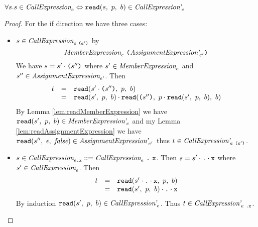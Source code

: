 \documentclass[preprint,10pt]{sigplanconf}
\begin{document}
\begin{lemma}\mbox{}
  
  \( \forall s. s \in \textit{CallExpression}_{e} \Leftrightarrow 
  \texttt{read}(s,~p,~b) \in \textit{CallExpression'}_{e} \)
\end{lemma}
\begin{proof}
  For the if direction we have three cases:
  \begin{itemize}
  \item \( s \in \textit{CallExpression}_{e~\texttt{(}e'\texttt{)}} \) by
    \[
    \textit{MemberExpression}_{e}~\texttt{(}\textit{AssignmentExpression'}_{e'}\texttt{)}
    \]
    We have \( s = s' \cdot \texttt{(}s''\texttt{)} \) where \( s' \in
    \textit{MemberExpression}_{e} \) and \( s'' \in
    \textit{AssignmentExpression}_{e'} \). Then
    \[
    \begin{array}{rcl}
      t &=& \texttt{read}(s' \cdot \texttt{(}s''\texttt{)},~p,~b)
      \\
      &=& \texttt{read}(s',~p,~b) \cdot
      \texttt{read}(\texttt{(}s''\texttt{)},~
        p \cdot \texttt{read}(s',~p,~b)
      ,~b)
    \end{array}
    \]
    By Lemma \ref{lem:readMemberExpression} we have \(
    \texttt{read}(s',~p,~b) \in \textit{MemberExpression'}_{e} \) and my Lemma
    \ref{lem:readAssignmentExpression} we have
    \(\texttt{read}(s'',~\epsilon,~\textit{false}) \in
    \textit{AssignmentExpression'}_{e'} \) thus
    \( t \in \textit{CallExpression'}_{e~\texttt{(}e'\texttt{)}} \).

  \item \( s \in \textit{CallExpression}_{e\texttt{.\texttt{x}}} ::=
    \textit{CallExpression}_{e} ~\texttt{.} ~\texttt{x} \). Then
    \( s = s' \cdot \texttt{.}\cdot \texttt{x} \) where \( s' \in
    \textit{CallExpression}_{e} \). Then
    \[
    \begin{array}{rcl}
      t &=& \texttt{read}(s' \cdot \texttt{.} \cdot \texttt{x},~p,~b)
      \\
      &=& \texttt{read}(s',~p,~b) \cdot \texttt{.}\cdot \texttt{x}
    \end{array}
    \]
    By induction \( \texttt{read}(s',~p,~b) \in \textit{CallExpression'}_{e}
    \). Thus \( t \in \textit{CallExpression'}_{e~\texttt{.\texttt{x}}} \).
  \end{itemize}
\end{proof}
\end{document}

